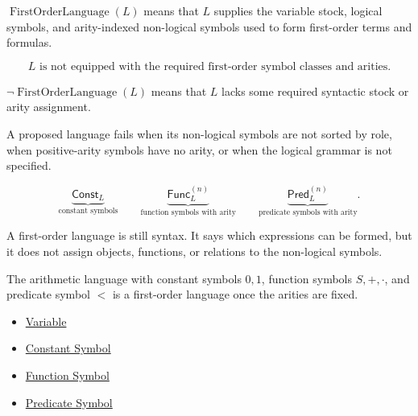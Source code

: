 \begin{remark*}
\(\operatorname{FirstOrderLanguage}(L)\) means that \(L\) supplies the variable
stock, logical symbols, and arity-indexed non-logical symbols used to form
first-order terms and formulas.
\end{remark*}

\begin{remark*}
\[
L \text{ is not equipped with the required first-order symbol classes and arities.}
\]
\end{remark*}

\begin{remark*}
\(\neg\operatorname{FirstOrderLanguage}(L)\) means that \(L\) lacks some
required syntactic stock or arity assignment.
\end{remark*}

\begin{remark*}
A proposed language fails when its non-logical symbols are not sorted by role,
when positive-arity symbols have no arity, or when the logical grammar is not
specified.
\end{remark*}

\begin{remark*}
\[
\underbrace{\mathsf{Const}_{L}}_{\text{constant symbols}}
\qquad
\underbrace{\mathsf{Func}_{L}^{(n)}}_{\text{function symbols with arity}}
\qquad
\underbrace{\mathsf{Pred}_{L}^{(n)}}_{\text{predicate symbols with arity}}.
\]
\end{remark*}

\begin{remark*}[Interpretation]
A first-order language is still syntax. It says which expressions can be
formed, but it does not assign objects, functions, or relations to the
non-logical symbols.
\end{remark*}

\begin{remark*}[Examples]
The arithmetic language with constant symbols \(0,1\), function symbols
\(S,+,\cdot\), and predicate symbol \(<\) is a first-order language once the
arities are fixed.
\end{remark*}

\begin{dependencies}
\begin{itemize}
  \item \hyperref[def:variable]{Variable}
  \item \hyperref[def:constant-symbol]{Constant Symbol}
  \item \hyperref[def:function-symbol]{Function Symbol}
  \item \hyperref[def:predicate-symbol]{Predicate Symbol}
\end{itemize}
\end{dependencies}

